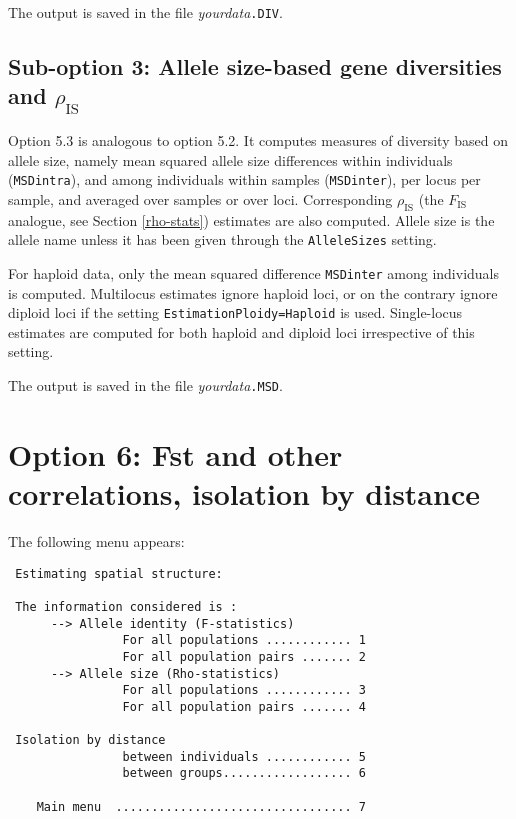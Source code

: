 \documentclass[12pt,]{book}
\begin{document}
The output is saved in the file \emph{yourdata}\texttt{.DIV}.

\subsection{\texorpdfstring{Sub-option 3: Allele size-based gene
diversities and
\(\rho_{\mathrm{IS}}\)}{Sub-option 3: Allele size-based gene diversities and \textbackslash{}rho\_\{\textbackslash{}mathrm\{IS\}\}}}\label{sub-option-3-allele-size-based-gene-diversities-and-rho_mathrmis}

Option 5.3 is analogous to option 5.2. It computes measures of diversity
based on allele size, namely mean squared allele size differences within
individuals (\texttt{MSDintra}), and among individuals within samples
(\texttt{MSDinter}), per locus per sample, and averaged over samples or
over loci. Corresponding \(\rho_\mathrm{IS}\) (the \(F_\mathrm{IS}\)
analogue, see Section \ref{rho-stats}) estimates are also computed.
Allele size is the allele name unless it has been given through the
\texttt{AlleleSizes} setting.

For haploid data, only the mean squared difference \texttt{MSDinter}
among individuals is computed. Multilocus estimates ignore haploid loci,
or on the contrary ignore diploid loci if the setting
\texttt{EstimationPloidy=Haploid} is used. Single-locus estimates are
computed for both haploid and diploid loci irrespective of this setting.

The output is saved in the file \emph{yourdata}\texttt{.MSD}.

\section{Option 6: Fst and other correlations, isolation by
distance}\label{option-6-fst-and-other-correlations-isolation-by-distance}

The following menu appears:

\begin{verbatim}
 Estimating spatial structure:

 The information considered is :
      --> Allele identity (F-statistics)
                For all populations ............ 1
                For all population pairs ....... 2
      --> Allele size (Rho-statistics)
                For all populations ............ 3
                For all population pairs ....... 4

 Isolation by distance
                between individuals ............ 5
                between groups.................. 6

    Main menu  ................................. 7
\end{verbatim}
\end{document}

